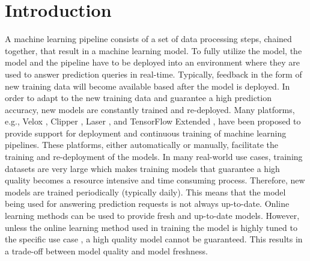 

\section{Introduction} \label{introduction}
A machine learning pipeline consists of a set of data processing steps, chained together, that result in a machine learning model.
To fully utilize the model,  the model and the pipeline have to be deployed into an environment where they are used to answer prediction queries in real-time.
Typically, feedback in the form of new training data will become available based after the model is deployed.
In order to adapt to the new training data and guarantee a high prediction accuracy, new models are constantly trained and re-deployed.
Many platforms, e.g., Velox \cite{crankshaw2014missing}, Clipper \cite{crankshaw2016clipper}, Laser \cite{agarwal2014laser}, and TensorFlow Extended \cite{baylor2017tfx}, have been proposed to provide support for deployment and continuous training of machine learning pipelines. 
These platforms, either automatically or manually, facilitate the training and re-deployment of the models.
In many real-world use cases, training datasets are very large which makes training models that guarantee a high quality becomes a resource intensive and time consuming process.
Therefore, new models are trained periodically (typically daily).
This means that the model being used for answering prediction requests is not always up-to-date.
Online learning methods can be used to provide fresh and up-to-date models.
However, unless the online learning method used in training the model is highly tuned to the specific use case \cite{ma2009identifying}, a high quality model cannot be guaranteed.
This results in a trade-off between model quality and model freshness.

